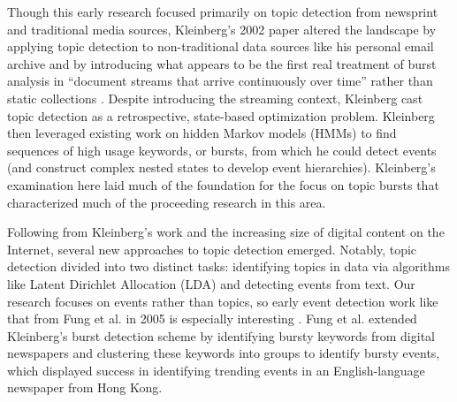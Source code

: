\documentclass{sig-alternate}
\begin{document}
Though this early research focused primarily on topic detection from newsprint and traditional media sources, Kleinberg's 2002 paper altered the landscape by applying topic detection to non-traditional data sources like his personal email archive and by introducing what appears to be the first real treatment of burst analysis in ``document streams that arrive continuously over time'' rather than  static collections \cite{Kleinberg:2002:BHS:775047.775061}. 
Despite introducing the streaming context, Kleinberg cast topic detection as a retrospective, state-based optimization problem.
Kleinberg then leveraged existing work on hidden Markov models (HMMs) to find sequences of high usage keywords, or bursts, from which he could detect events (and construct complex nested states to develop event hierarchies).
Kleinberg's examination here laid much of the foundation for the focus on topic bursts that characterized much of the proceeding research in this area.

Following from Kleinberg's work and the increasing size of digital content on the Internet, several new approaches to topic detection emerged.
Notably, topic detection divided into two distinct tasks: identifying topics in data via algorithms like Latent Dirichlet Allocation (LDA) \cite{blei2003latent} and detecting events from text.
Our research focuses on events rather than topics, so early event detection work like that from Fung et al. in 2005 is especially interesting \cite{Fung:2005:PFB:1083592.1083616}.
Fung et al. extended Kleinberg's burst detection scheme by identifying bursty keywords from digital newspapers and clustering these keywords into groups to identify bursty events, which displayed success in identifying trending events in an English-language newspaper from Hong Kong.

\end{document}
